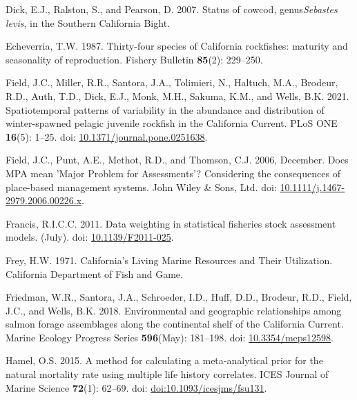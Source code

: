 \documentclass[11pt,
  english,
]{article}
\newlength{\cslhangindent}
\newenvironment{CSLReferences}[2] %
 {%
  \setlength{\parindent}{0pt}
  \ifodd #1 \everypar{\setlength{\hangindent}{\cslhangindent}}\ignorespaces\fi
  \ifnum #2 > 0
  \setlength{\parskip}{#2\baselineskip}
  \fi
 }%
 {}
\begin{document}
\begin{CSLReferences}{1}{0}
\leavevmode{}%
Dick, E.J., Ralston, S., and Pearson, D. 2007. {Status of cowcod, genus\emph{Sebastes levis}, in the Southern California Bight}.

\leavevmode{}%
Echeverria, T.W. 1987. {Thirty-four species of California rockfishes: maturity and seasonality of reproduction}. Fishery Bulletin \textbf{85}(2): 229--250.

\leavevmode{}%
Field, J.C., Miller, R.R., Santora, J.A., Tolimieri, N., Haltuch, M.A., Brodeur, R.D., Auth, T.D., Dick, E.J., Monk, M.H., Sakuma, K.M., and Wells, B.K. 2021. {Spatiotemporal patterns of variability in the abundance and distribution of winter-spawned pelagic juvenile rockfish in the California Current}. PLoS ONE \textbf{16}(5): 1--25. doi: \href{https://doi.org/10.1371/journal.pone.0251638}{10.1371/journal.pone.0251638}.

\leavevmode{}%
Field, J.C., Punt, A.E., Methot, R.D., and Thomson, C.J. 2006, December. {Does MPA mean 'Major Problem for Assessments'? Considering the consequences of place-based management systems}. John Wiley \& Sons, Ltd. doi: \href{https://doi.org/10.1111/j.1467-2979.2006.00226.x}{10.1111/j.1467-2979.2006.00226.x}.

\leavevmode{}%
Francis, R.I.C.C. 2011. {Data weighting in statistical fisheries stock assessment models}. (July). doi: \href{https://doi.org/10.1139/F2011-025}{10.1139/F2011-025}.

\leavevmode{}%
Frey, H.W. 1971. {California's Living Marine Resources and Their Utilization. California Department of Fish and Game}.

\leavevmode{}%
Friedman, W.R., Santora, J.A., Schroeder, I.D., Huff, D.D., Brodeur, R.D., Field, J.C., and Wells, B.K. 2018. {Environmental and geographic relationships among salmon forage assemblages along the continental shelf of the California Current}. Marine Ecology Progress Series \textbf{596}(May): 181--198. doi: \href{https://doi.org/10.3354/meps12598}{10.3354/meps12598}.

\leavevmode{}%
Hamel, O.S. 2015. {A method for calculating a meta-analytical prior for the natural mortality rate using multiple life history correlates}. ICES Journal of Marine Science \textbf{72}(1): 62--69. doi: \href{https://doi.org/doi:10.1093/icesjms/fsu131}{doi:10.1093/icesjms/fsu131}.


\end{CSLReferences}
\end{document}
